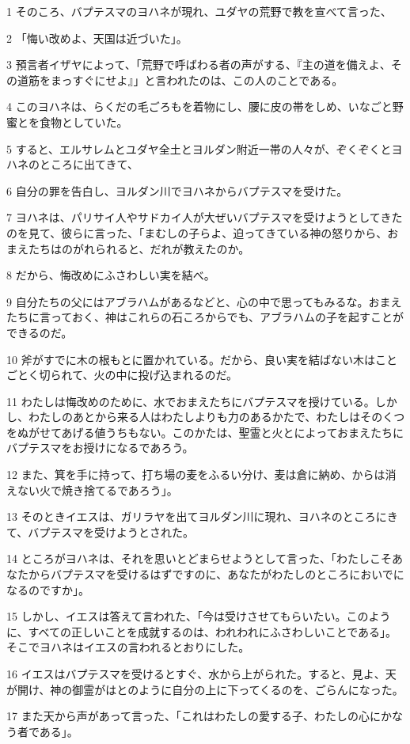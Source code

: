 \par 1 そのころ、バプテスマのヨハネが現れ、ユダヤの荒野で教を宣べて言った、
\par 2 「悔い改めよ、天国は近づいた」。
\par 3 預言者イザヤによって、「荒野で呼ばわる者の声がする、『主の道を備えよ、その道筋をまっすぐにせよ』」と言われたのは、この人のことである。
\par 4 このヨハネは、らくだの毛ごろもを着物にし、腰に皮の帯をしめ、いなごと野蜜とを食物としていた。
\par 5 すると、エルサレムとユダヤ全土とヨルダン附近一帯の人々が、ぞくぞくとヨハネのところに出てきて、
\par 6 自分の罪を告白し、ヨルダン川でヨハネからバプテスマを受けた。
\par 7 ヨハネは、パリサイ人やサドカイ人が大ぜいバプテスマを受けようとしてきたのを見て、彼らに言った、「まむしの子らよ、迫ってきている神の怒りから、おまえたちはのがれられると、だれが教えたのか。
\par 8 だから、悔改めにふさわしい実を結べ。
\par 9 自分たちの父にはアブラハムがあるなどと、心の中で思ってもみるな。おまえたちに言っておく、神はこれらの石ころからでも、アブラハムの子を起すことができるのだ。
\par 10 斧がすでに木の根もとに置かれている。だから、良い実を結ばない木はことごとく切られて、火の中に投げ込まれるのだ。
\par 11 わたしは悔改めのために、水でおまえたちにバプテスマを授けている。しかし、わたしのあとから来る人はわたしよりも力のあるかたで、わたしはそのくつをぬがせてあげる値うちもない。このかたは、聖霊と火とによっておまえたちにバプテスマをお授けになるであろう。
\par 12 また、箕を手に持って、打ち場の麦をふるい分け、麦は倉に納め、からは消えない火で焼き捨てるであろう」。
\par 13 そのときイエスは、ガリラヤを出てヨルダン川に現れ、ヨハネのところにきて、バプテスマを受けようとされた。
\par 14 ところがヨハネは、それを思いとどまらせようとして言った、「わたしこそあなたからバプテスマを受けるはずですのに、あなたがわたしのところにおいでになるのですか」。
\par 15 しかし、イエスは答えて言われた、「今は受けさせてもらいたい。このように、すべての正しいことを成就するのは、われわれにふさわしいことである」。そこでヨハネはイエスの言われるとおりにした。
\par 16 イエスはバプテスマを受けるとすぐ、水から上がられた。すると、見よ、天が開け、神の御霊がはとのように自分の上に下ってくるのを、ごらんになった。
\par 17 また天から声があって言った、「これはわたしの愛する子、わたしの心にかなう者である」。

